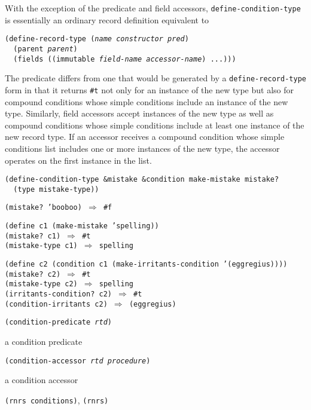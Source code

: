 With the exception of the predicate and field accessors,
\texttt{define-condition-type} is essentially an ordinary record
definition equivalent to


\begin{alltt}
(define-record-type (\textit{name} \textit{constructor} \textit{pred})
  (parent \textit{parent})
  (fields ((immutable \textit{field-name} \textit{accessor-name}) ...)))
\end{alltt}


The predicate differs from one that would be generated by a
\texttt{define-record-type} form in that it returns \texttt{\#{}t} not only
for an instance of the new type but also for compound conditions whose simple
conditions include an instance of the new type.
Similarly, field accessors accept instances of the new type as well as
compound conditions whose simple conditions include at least one
instance of the new record type.
If an accessor receives a compound condition whose simple conditions
list includes one or more instances of the new type, the accessor
operates on the first instance in the list.


\begin{alltt}
(define-condition-type \&{}mistake \&{}condition make-mistake mistake?
  (type mistake-type))

(mistake? 'booboo) \(\Rightarrow\) \#{}f

(define c1 (make-mistake 'spelling))
(mistake? c1) \(\Rightarrow\) \#{}t
(mistake-type c1) \(\Rightarrow\) spelling

(define c2 (condition c1 (make-irritants-condition '(eggregius))))
(mistake? c2) \(\Rightarrow\) \#{}t
(mistake-type c2) \(\Rightarrow\) spelling
(irritants-condition? c2) \(\Rightarrow\) \#{}t
(condition-irritants c2) \(\Rightarrow\) (eggregius)
\end{alltt}

\begin{description}

\label{exceptions_s18}\item[procedure] \texttt{(condition-predicate \textit{rtd})}



\item[returns] a condition predicate


\item[procedure] \texttt{(condition-accessor \textit{rtd} \textit{procedure})}



\item[returns] a condition accessor


\item[libraries] \texttt{(rnrs conditions)}, \texttt{(rnrs)}
\end{description}


